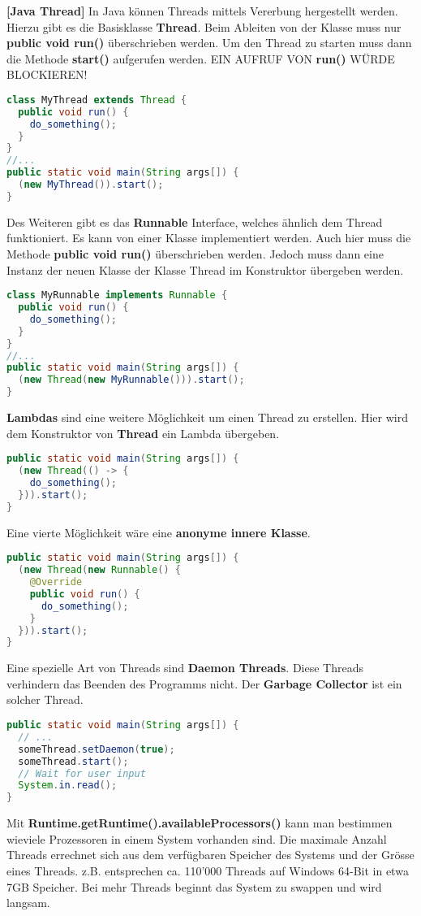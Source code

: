 \documentclass[8pt]{extarticle}
\let\oldtextbf\textbf
\renewcommand{\textbf}{\tiny\oldtextbf}
\begin{document}
\begin{multicols*}{5}
\textbf{[Java Thread]}
In Java können Threads mittels Vererbung hergestellt werden. Hierzu gibt es die Basisklasse \textbf{Thread}. Beim Ableiten von der Klasse muss nur \textbf{public void run()} überschrieben werden. Um den Thread zu starten muss dann die Methode \textbf{start()} aufgerufen werden. EIN AUFRUF VON \textbf{run()} WÜRDE BLOCKIEREN!
\begin{lstlisting}[language=java]
class MyThread extends Thread {
  public void run() {
    do_something();
  }
}
//...
public static void main(String args[]) {
  (new MyThread()).start();
}
\end{lstlisting}
Des Weiteren gibt es das \textbf{Runnable} Interface, welches ähnlich dem Thread funktioniert. Es kann von einer Klasse implementiert werden. Auch hier muss die Methode \textbf{public void run()} überschrieben werden. Jedoch muss dann eine Instanz der neuen Klasse der Klasse Thread im Konstruktor übergeben werden.
\begin{lstlisting}[language=java]
class MyRunnable implements Runnable {
  public void run() {
    do_something();
  }
}
//...
public static void main(String args[]) {
  (new Thread(new MyRunnable())).start();
}
\end{lstlisting}
\textbf{Lambdas} sind eine weitere Möglichkeit um einen Thread zu erstellen. Hier wird dem Konstruktor von \textbf{Thread} ein Lambda übergeben.
\begin{lstlisting}[language=java]
public static void main(String args[]) {
  (new Thread(() -> {
    do_something();
  })).start();
}
\end{lstlisting}
Eine vierte Möglichkeit wäre eine \textbf{anonyme innere Klasse}.
\begin{lstlisting}[language=java]
public static void main(String args[]) {
  (new Thread(new Runnable() {
    @Override
    public void run() {
      do_something();
    }
  })).start();
}
\end{lstlisting}
Eine spezielle Art von Threads sind \textbf{Daemon Threads}. Diese Threads verhindern das Beenden des Programms nicht. Der \textbf{Garbage Collector} ist ein solcher Thread.
\begin{lstlisting}[language=java]
public static void main(String args[]) {
  // ...
  someThread.setDaemon(true);
  someThread.start();
  // Wait for user input
  System.in.read();
}
\end{lstlisting}
Mit \textbf{Runtime.getRuntime().availableProcessors()} kann man bestimmen wieviele Prozessoren in einem System vorhanden sind. Die maximale Anzahl Threads errechnet sich aus dem verfügbaren Speicher des Systems und der Grösse eines Threads. z.B. entsprechen ca. 110'000 Threads auf Windows 64-Bit in etwa 7GB Speicher. Bei mehr Threads beginnt das System zu swappen und wird langsam.\\\\

\end{multicols*}
\end{document}
